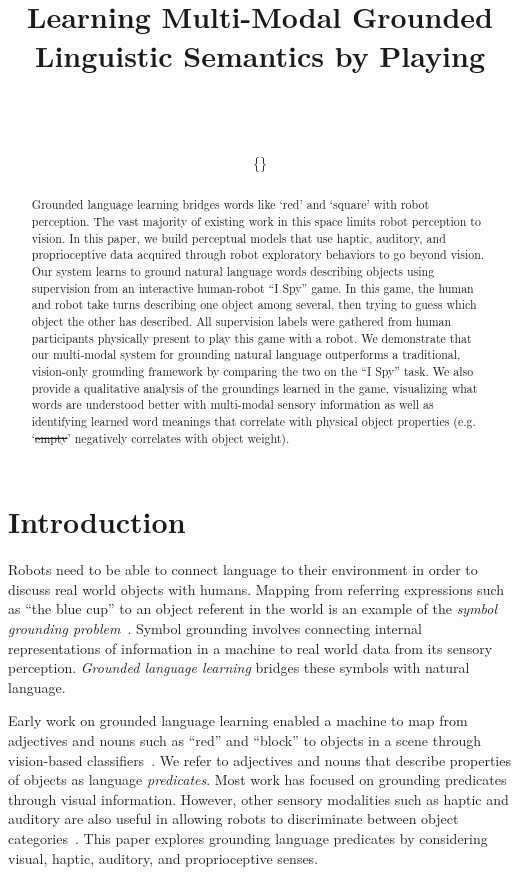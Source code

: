 \documentclass{article}
\title{Learning Multi-Modal Grounded Linguistic Semantics by Playing \ispy}
\author{\DIFdelbegin \DIFdel{Paper XXX}\DIFdelend \DIFaddbegin \DIFadd{Jesse Thomason, Jivko Sinapov, Maxwell Svetlik, Peter Stone,}\and \DIFadd{Raymond Mooney }\\
\DIFadd{Department of Computer Science, University of Texas at Austin}\\
\DIFadd{Austin, TX 78712, USA}\\
\{\DIFadd{jesse, jsinapov, maxwell, pstone, mooney}\}\DIFadd{@cs.utexas.edu}\DIFaddend }
\newcommand{\ispy}{``I Spy''\xspace}
\providecommand{\DIFadd}[1]{{\protect\color{blue}\uwave{#1}}} %
\providecommand{\DIFdel}[1]{{\protect\color{red}\sout{#1}}}                      %
\providecommand{\DIFaddbegin}{} %
\providecommand{\DIFaddend}{} %
\providecommand{\DIFdelbegin}{} %
\providecommand{\DIFdelend}{} %
\begin{document}
\maketitle

\begin{abstract}
Grounded language learning bridges words like `red' and `square' with robot perception.
The vast majority of existing work in this space limits robot perception to vision.
In this paper, we build perceptual models that use haptic, auditory, and proprioceptive data acquired through robot exploratory behaviors to go beyond vision.
Our system learns to ground natural language words describing objects using supervision from an interactive human-robot \ispy game.
In this game, the human and robot take turns describing one object among several, then trying to guess which object the other has described.
All supervision labels were gathered from human participants physically present to play this game with a robot.
We demonstrate that our multi-modal system for grounding natural language outperforms a traditional, vision-only grounding framework by comparing the two on the \ispy task.
We also provide a qualitative analysis of the groundings learned in the game, visualizing what words are understood better with multi-modal sensory information as well as identifying learned word meanings that correlate with physical object properties (e.g. `\DIFdelbegin \DIFdel{empty}\DIFdelend \DIFaddbegin \DIFadd{small}\DIFaddend ' negatively correlates with object weight).
\end{abstract}

\section{Introduction}
\label{sec:introduction}
Robots need to be able to connect language to their environment in order to discuss real world objects with humans.
Mapping from referring expressions such as ``the blue cup'' to an object referent in the world is an example of the \textit{symbol grounding problem}~\cite{harnad:phys90}.
Symbol grounding involves connecting internal representations of information in a machine to real world data from its sensory perception.
\textit{Grounded language learning} bridges these symbols with natural language.

Early work on grounded language learning enabled a machine to map from adjectives and nouns such as ``red'' and ``block'' to objects in a scene through vision-based classifiers~\cite{roy:evocomm01}.
We refer to adjectives and nouns that describe properties of objects as language \textit{predicates}.
Most work has focused on grounding predicates through visual information. However, other sensory modalities such as haptic and auditory are also useful in allowing robots to discriminate between object categories~\cite{sinapov:icra14}.
This paper explores grounding language predicates by considering visual, haptic, auditory, and proprioceptive senses. 
\end{document}
